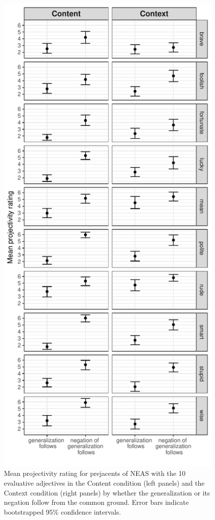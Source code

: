 \documentclass[11pt,fleqn]{article}
\newcommand{\6}{\mbox{$[\hspace*{-.6mm}[$}}
\newcommand{\9}{\mbox{$]\hspace*{-.6mm}]$}}
\begin{document}
\begin{figure}[H]
\begin{center}
\includegraphics[scale=.7]{../exp1/graphs/targetmeans-by-condition-and-adj}

\caption{Mean projectivity rating for prejacents of NEAS with the 10 evaluative adjectives in the Content condition (left panels) and the Context condition (right panels) by whether the generalization or its negation follow from the common ground. Error bars indicate bootstrapped 95\% confidence intervals.}\label{f-condis}
\end{center}
\end{figure}
\end{document}
